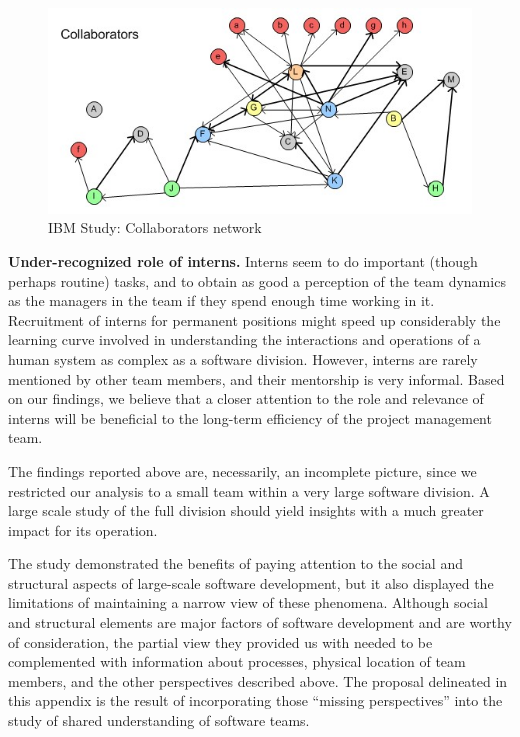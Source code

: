 \begin{figure}[tbp]
\centering
\includegraphics[scale=1.0]{collaborators}
\caption{\label{fig:Collaborators}IBM Study: Collaborators network}
\end{figure}

\textbf{Under-recognized role of interns.} Interns seem to do important (though perhaps routine) tasks, and to obtain as good a perception of the team dynamics as the managers in the team if they spend enough time working in it. Recruitment of interns for permanent positions might speed up considerably the learning curve involved in understanding the interactions and operations of a human system as complex as a software division. However, interns are rarely mentioned by other team members, and their mentorship is very informal. Based on our findings, we believe that a closer attention to the role and relevance of interns will be beneficial to the long-term efficiency of the project management team.

The findings reported above are, necessarily, an incomplete picture, since we restricted our analysis to a small team within a very large software division. A large scale study of the full division should yield insights with a much greater impact for its operation.

The study demonstrated the benefits of paying attention to the social and structural aspects of large-scale software development, but it also displayed the limitations of maintaining a narrow view of these phenomena. Although social and structural elements are major factors of software development and are worthy of consideration, the partial view they provided us with needed to be complemented with information about processes, physical location of team members, and the other perspectives described above. The proposal delineated in this appendix is the result of incorporating those ``missing perspectives'' into the study of shared understanding of software teams.

